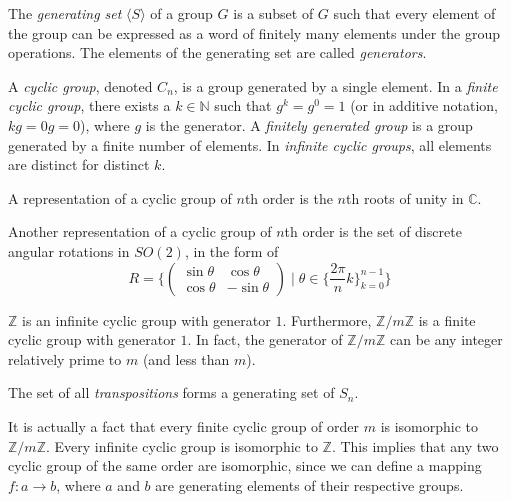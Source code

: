 \documentclass{article}
\begin{document}
    \begin{definition}
      The \textit{generating set} $\langle S \rangle$ of a group $G$ is a subset of $G$ such that every element of the group can be expressed as a word of finitely many elements under the group operations. The elements of the generating set are called \textit{generators}.
    \end{definition}

    \begin{definition}
      A \textit{cyclic group}, denoted $C_{n}$, is a group generated by a single element. In a \textit{finite cyclic group}, there exists a $k \in \mathbb{N}$ such that $g^{k} = g^{0} = 1$ (or in additive notation, $kg = 0g = 0$), where $g$ is the generator. A \textit{finitely generated group} is a group generated by a finite number of elements. In \textit{infinite cyclic groups}, all elements are distinct for distinct $k$. 
    \end{definition}

    \begin{example}
      A representation of a cyclic group of $n$th order is the $n$th roots of unity in $\mathbb{C}$.
    \end{example}

    \begin{example}
      Another representation of a cyclic group of $n$th order is the set of discrete angular rotations in $SO(2)$, in the form of 
      \[ R =  \bigg\{ \begin{pmatrix}
      \sin{\theta} & \cos{\theta} \\
      \cos{\theta} & -\sin{\theta}
      \end{pmatrix}\; \bigg| \; \theta \in \Big\{\frac{2 \pi}{n} k\Big\}_{k = 0}^{n-1} \bigg\} \]
    \end{example}

    \begin{example}
      $\mathbb{Z}$ is an infinite cyclic group with generator $1$. Furthermore, $\mathbb{Z}/m\mathbb{Z}$ is a finite cyclic group with generator $1$. In fact, the generator of $\mathbb{Z}/m\mathbb{Z}$ can be any integer relatively prime to $m$ (and less than $m$). \end{example}

    \begin{example}
      The set of all \textit{transpositions} forms a generating set of $S_{n}$. 
    \end{example}

    It is actually a fact that every finite cyclic group of order $m$ is isomorphic to $\mathbb{Z}/m\mathbb{Z}$. Every infinite cyclic group is isomorphic to $\mathbb{Z}$. This implies that any two cyclic group of the same order are isomorphic, since we can define a mapping $f:a\longrightarrow b$, where $a$ and $b$ are generating elements of their respective groups. 
\end{document}

